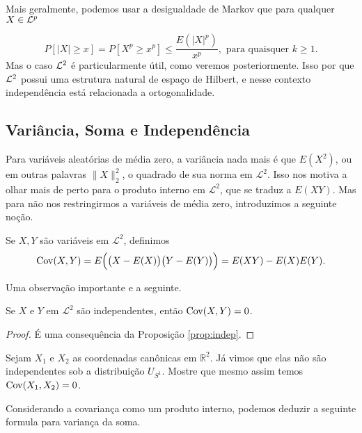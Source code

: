 Mais geralmente, podemos usar a  desigualdade de Markov que para qualquer $X \in {\ensuremath{\mathcal L}}^p$

\begin{equation}
  P[|X| \geq x] = P [X^p \geq x^p] \leq \frac{E(|X|^p)}{x^p}, \text{ para quaisquer $k \geq 1$.}
\end{equation}
Mas o caso ${\mathcal L}^2$ é particularmente útil, como veremos posteriormente.
Isso por que  ${\mathcal L}^2$ possui uma estrutura natural de espaço de Hilbert, e nesse contexto independência está relacionada a ortogonalidade.

\subsection{Variância, Soma e Independência }

Para variáveis aleatórias de média zero, a variância nada mais é que $E(X^2)$, ou em outras palavras $\lVert X \rVert^2_2$, o quadrado de sua norma em $\mathcal{L}^2$.
Isso nos motiva a olhar mais de perto para o produto interno em $\mathcal{L}^2$, que se traduz a $E(XY)$.
Mas para não nos restringirmos a variáveis de média zero, introduzimos a seguinte noção.

\begin{definition}
  Se $X, Y$ são variáveis em $\mathcal{L}^2$, definimos
  \begin{equation}
    \operatorname{Cov}(X,Y)
    = E\Big( \big(X - E(X)\big) \big(Y - E(Y)\big) \Big)
    = E(XY) - E(X)E(Y).
  \end{equation}
\end{definition}

Uma observação importante e a seguinte.
\begin{proposition}
  Se $X$ e $Y$ em $\mathcal{L}^2$ são independentes, então $\operatorname{Cov}(X,Y) = 0$.
\end{proposition}

\begin{proof}
 É uma consequência da Proposição \ref{prop:indep}.
\end{proof}

\begin{exercise}
  Sejam $X_1$ e $X_2$ as coordenadas canônicas em $\mathbb{R}^2$.
  Já vimos que elas não são independentes sob a distribuição $U_{S^1}$.
  Mostre que mesmo assim temos $\operatorname{Cov}(X_1, X_2) = 0$.
\end{exercise}

Considerando a covariança como um produto interno, podemos deduzir a seguinte formula para variança da soma.


